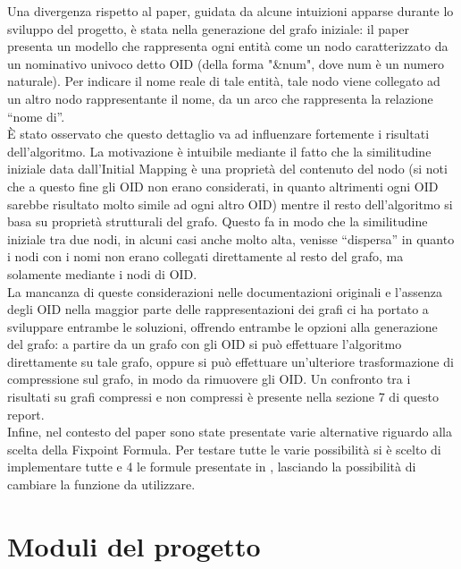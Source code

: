 \documentclass[a4paper,10pt]{article}
\begin{document}
Una divergenza rispetto al paper, guidata da alcune intuizioni apparse durante lo sviluppo del progetto, è stata nella generazione del grafo iniziale: il paper presenta un modello che rappresenta ogni entità come un nodo caratterizzato da un nominativo univoco detto OID (della forma "\&num", dove num è un numero naturale). Per indicare il nome reale di tale entità, tale nodo viene collegato ad un altro nodo rappresentante il nome, da un arco che rappresenta la relazione “nome di”. \\

È stato osservato che questo dettaglio va ad influenzare fortemente i risultati dell’algoritmo. La motivazione è intuibile mediante il fatto che la similitudine iniziale data dall’Initial Mapping è una proprietà del contenuto del nodo (si noti che a questo fine gli OID non erano considerati, in quanto altrimenti ogni OID sarebbe risultato molto simile ad ogni altro OID) mentre il resto dell’algoritmo si basa su proprietà strutturali del grafo. Questo fa in modo che la similitudine iniziale tra due nodi, in alcuni casi anche molto alta, venisse “dispersa” in quanto i nodi con i nomi non erano collegati direttamente al resto del grafo, ma solamente mediante i nodi di OID.\\

La mancanza di queste considerazioni nelle documentazioni originali e l'assenza degli OID nella maggior parte delle rappresentazioni dei grafi ci ha portato a sviluppare entrambe le soluzioni, offrendo entrambe le opzioni alla generazione del grafo: a partire da un grafo con gli OID si può effettuare l’algoritmo direttamente su tale grafo, oppure si può effettuare un’ulteriore trasformazione di compressione sul grafo, in modo da rimuovere gli OID. Un confronto tra i risultati su grafi compressi e non compressi è presente nella sezione 7 di questo report.\\

Infine, nel contesto del paper sono state presentate varie alternative riguardo alla scelta della Fixpoint Formula. Per testare tutte le varie possibilità si è scelto di implementare tutte e 4 le formule presentate in \citep{sfpaper_ext}, lasciando la possibilità di cambiare la funzione da utilizzare.



\section{Moduli del progetto}
\end{document}
